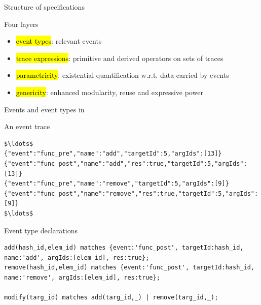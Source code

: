 \documentclass[10pt,usenames,dvipsnames]{beamer}
\begin{document}
\begin{frame}{Structure of \rml specifications}
  \begin{block}{Four layers}
    \begin{itemize}
    \item \hl{event types}: relevant events 
    \item \hl{trace expressions}: primitive and derived operators on sets of traces
    \item \hl{parametricity}: existential quantification w.r.t. data carried by events
    \item \hl{genericity}:  enhanced modularity, reuse and expressive power
    \end{itemize}
  \end{block}
\end{frame}


\begin{frame}[fragile]{Events and event types in \rml}
  \begin{block}{An event trace}
    \begin{lstlisting}[basicstyle=\ttfamily\scriptsize]
$\ldots$
{"event":"func_pre","name":"add","targetId":5,"argIds":[13]}      
{"event":"func_post","name":"add","res":true,"targetId":5,"argIds":[13]}
{"event":"func_pre","name":"remove","targetId":5,"argIds":[9]}
{"event":"func_post","name":"remove","res":true,"targetId":5,"argIds":[9]}
$\ldots$
    \end{lstlisting}
  \end{block}

  \begin{block}{Event type declarations}
    \begin{lstlisting}[basicstyle=\ttfamily\scriptsize]
add(hash_id,elem_id) matches {event:'func_post', targetId:hash_id, name:'add', argIds:[elem_id], res:true};
remove(hash_id,elem_id) matches {event:'func_post', targetId:hash_id, name:'remove', argIds:[elem_id], res:true};

modify(targ_id) matches add(targ_id,_) | remove(targ_id,_);
    \end{lstlisting}
  \end{block}
\end{frame}
\end{document}
